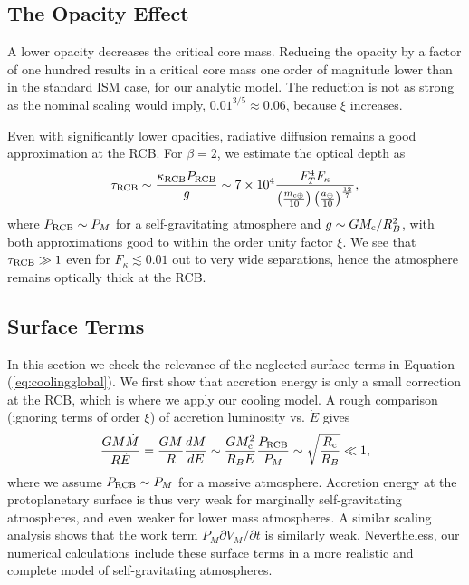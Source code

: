 \documentclass[apj, numberedappendix]{emulateapj}
\newcommand{\p}{\partial}
\newcommand{\Eq}[1]{Equation\,(\ref{#1})}
\newcommand{\co}{_{\rm c}}
\newcommand{\cb}{_{\rm RCB}}
\newcommand{\mc}{m_{\rm c \oplus}}
\newcommand{\au}{a_\oplus}
\begin{document}
\subsection{The Opacity Effect}
\label{opacityan}
A  lower opacity  decreases the critical core mass.  Reducing the opacity by a factor of one hundred results in a critical core mass one order of magnitude lower than in the standard ISM case, for our analytic model. The reduction is not  as strong as the nominal scaling would imply, $0.01^{3/5} \approx 0.06$, because $\xi$ increases.

Even with significantly lower opacities, radiative diffusion remains a good approximation at the RCB. For $\beta = 2$, we estimate the optical depth as
\begin{equation}
\tau\cb \sim {\kappa\cb P\cb \over g} \sim 7 \times 10^4 {F_T^4 F_\kappa \over \left(\mc \over 10 \right) \left(\au \over 10\right)^{12 \over 7}}, 
\end{equation} 
where $P\cb \sim P_M$ for a self-gravitating atmosphere and $g \sim G M\co/R_B^2$, with both approximations good to within the order unity factor $\xi$.  We see that $\tau\cb \gg 1$ even for $F_\kappa \lesssim 0.01$ out to very wide separations, hence the atmosphere remains optically thick at the RCB.


\subsection{Surface Terms}
\label{surfterms}
In this section we check the relevance of the neglected surface terms in \Eq{eq:coolingglobal}.  We first show that accretion energy is only a small correction at the RCB, which is where we apply our cooling model. A rough comparison (ignoring terms of order $\xi$) of  accretion luminosity vs. $\dot{E}$ gives
\begin{equation}
{G M \dot{M} \over R \dot{E}} = {G M  \over R}{dM \over dE} \sim {G M\co^2 \over R_B E}{P\cb \over P_M} \sim \sqrt{R\co \over R_B} \ll 1,
\end{equation} 
where we assume $P\cb \sim P_M$  for a massive atmosphere.  Accretion energy at the protoplanetary surface is thus very weak for marginally self-gravitating atmospheres, and even weaker for lower mass atmospheres.  A similar scaling analysis shows that the work term $P_M \p V_M/\p t$ is similarly weak.  Nevertheless, our numerical calculations include these surface terms in a more realistic and complete model of self-gravitating atmospheres.
\end{document}
